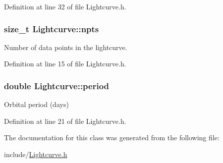 Definition at line 32 of file Lightcurve.h.

\hypertarget{classLightcurve_adf57f279eab9cb38a65ba09384dbf3f6}{
\subsubsection[{npts}]{\setlength{\rightskip}{0pt plus 5cm}size\_\-t {\bf Lightcurve::npts}}}
\label{classLightcurve_adf57f279eab9cb38a65ba09384dbf3f6}


Number of data points in the lightcurve. 



Definition at line 15 of file Lightcurve.h.

\hypertarget{classLightcurve_a6e8ac482decf1bbcc3f4eea9a4818646}{
\subsubsection[{period}]{\setlength{\rightskip}{0pt plus 5cm}double {\bf Lightcurve::period}}}
\label{classLightcurve_a6e8ac482decf1bbcc3f4eea9a4818646}


Orbital period (days) 



Definition at line 21 of file Lightcurve.h.



The documentation for this class was generated from the following file:\begin{DoxyCompactItemize}
\item 
include/\hyperlink{Lightcurve_8h}{Lightcurve.h}\end{DoxyCompactItemize}
